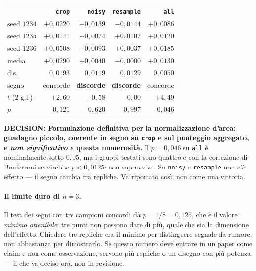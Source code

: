 \documentclass[11pt,a4paper]{article}
\newcommand{\decision}[1]{\textcolor{decision}{\textbf{DECISION:}} #1}
\begin{document}
\begin{center}\small
\begin{tabular}{lrrrr}
\toprule
 & \texttt{crop} & \texttt{noisy} & \texttt{resample} & \texttt{all} \\
\midrule
seed $1234$ & $+0{,}0220$ & $+0{,}0139$ & $-0{,}0144$ & $+0{,}0086$ \\
seed $1235$ & $+0{,}0141$ & $+0{,}0074$ & $+0{,}0107$ & $+0{,}0120$ \\
seed $1236$ & $+0{,}0508$ & $-0{,}0093$ & $+0{,}0037$ & $+0{,}0185$ \\
\midrule
media       & $+0{,}0290$ & $+0{,}0040$ & $-0{,}0000$ & $+0{,}0130$ \\
d.s.        & $0{,}0193$ & $0{,}0119$ & $0{,}0129$ & $0{,}0050$ \\
segno       & concorde & \textbf{discorde} & \textbf{discorde} & concorde \\
$t$ ($2$ g.l.) & $+2{,}60$ & $+0{,}58$ & $-0{,}00$ & $+4{,}49$ \\
$p$         & $0{,}121$ & $0{,}620$ & $0{,}997$ & $0{,}046$ \\
\bottomrule
\end{tabular}
\end{center}

\decision{\textbf{Formulazione definitiva per la normalizzazione d'area: guadagno piccolo,
coerente in segno su \texttt{crop} e sul punteggio aggregato, e \emph{non significativo} a questa
numerosit\`a.} Il $p = 0{,}046$ su \texttt{all} \`e nominalmente sotto $0{,}05$, ma i gruppi
testati sono quattro e con la correzione di Bonferroni servirebbe $p < 0{,}0125$: non
sopravvive. Su \texttt{noisy} e \texttt{resample} non c'\`e effetto --- il segno cambia fra
repliche. Va riportato cos\`i, non come una vittoria.}

\paragraph{Il limite duro di $n=3$.} Il test dei segni con tre campioni concordi d\`a
$p = 1/8 = 0{,}125$, che \`e il valore \emph{minimo ottenibile}: tre punti non possono dare di
pi\`u, quale che sia la dimensione dell'effetto. Chiedere tre repliche era il minimo per
distinguere segnale da rumore, non abbastanza per dimostrarlo. Se questo numero deve entrare in
un paper come claim e non come osservazione, servono pi\`u repliche o un disegno con pi\`u
potenza --- il che va deciso ora, non in revisione.
\end{document}
